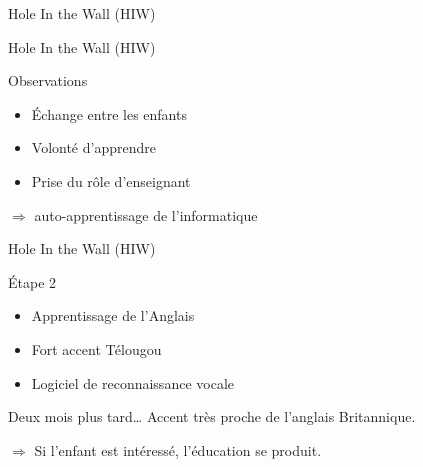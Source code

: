 \begin{frame}{Hole In the Wall (HIW)}

    
\end{frame}

\begin{frame}{Hole In the Wall (HIW)}
  \begin{block}{Observations}
    \begin{itemize}
      \item Échange entre les enfants
      \item Volonté d'apprendre
      \item Prise du rôle d'enseignant
    \end{itemize}
    $\Rightarrow$ auto-apprentissage de l'informatique
  \end{block}
\end{frame}

\begin{frame}{Hole In the Wall (HIW)}
  \begin{block}{Étape 2}
    \begin{itemize}
      \item Apprentissage de l'Anglais
      \item Fort accent Télougou
      \item Logiciel de reconnaissance vocale
    \end{itemize}
  \end{block}
\pause
  \begin{block}{Deux mois plus tard\ldots}
    Accent très proche de l'anglais Britannique.
    
    $\Rightarrow$ Si l'enfant est intéressé, l'éducation se produit.
  \end{block}
\end{frame}

